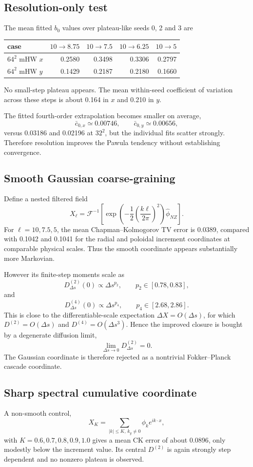 \documentclass[11pt,a4paper]{article}
\begin{document}
\subsection{Resolution-only test}
The mean fitted $b_0$ values over plateau-like seeds 0, 2 and 3 are
\begin{center}
\begin{tabular}{lrrrr}
\toprule
case & $10\to8.75$ & $10\to7.5$ & $10\to6.25$ & $10\to5$\\
\midrule
$64^2$ mHW $x$ & 0.2580 & 0.3498 & 0.3306 & 0.2797\\
$64^2$ mHW $y$ & 0.1429 & 0.2187 & 0.2180 & 0.1660\\
\bottomrule
\end{tabular}
\end{center}
No small-step plateau appears. The mean within-seed coefficient of variation across these steps is about 0.164 in $x$ and 0.210 in $y$.

The fitted fourth-order extrapolation becomes smaller on average,
\[
\bar c_{0,x}\simeq0.00746,
\qquad
\bar c_{0,y}\simeq0.00656,
\]
versus 0.03186 and 0.02196 at $32^2$, but the individual fits scatter strongly. Therefore resolution improves the Pawula tendency without establishing convergence.

\subsection{Smooth Gaussian coarse-graining}
Define a nested filtered field
\[
X_\ell=\mathcal F^{-1}\!\left[
\exp\!\left(-\frac12\left(\frac{k\ell}{2\pi}\right)^2\right)
\widehat\phi_{NZ}\right].
\]
For $\ell=10,7.5,5$, the mean Chapman--Kolmogorov TV error is 0.0389, compared with 0.1042 and 0.1041 for the radial and poloidal increment coordinates at comparable physical scales. Thus the smooth coordinate appears substantially more Markovian.

However its finite-step moments scale as
\[
D^{(2)}_{\Delta s}(0)\propto\Delta s^{p_2},
\qquad
p_2\in[0.78,0.83],
\]
and
\[
D^{(4)}_{\Delta s}(0)\propto\Delta s^{p_4},
\qquad
p_4\in[2.68,2.86].
\]
This is close to the differentiable-scale expectation $\Delta X=O(\Delta s)$, for which $D^{(2)}=O(\Delta s)$ and $D^{(4)}=O(\Delta s^3)$. Hence the improved closure is bought by a degenerate diffusion limit,
\[
\lim_{\Delta s\to0}D^{(2)}_{\Delta s}=0.
\]
The Gaussian coordinate is therefore rejected as a nontrivial Fokker--Planck cascade coordinate.

\subsection{Sharp spectral cumulative coordinate}
A non-smooth control,
\[
X_K=\sum_{|k|\le K,\,k_y\ne0}\phi_k e^{i k\cdot x},
\]
with $K=0.6,0.7,0.8,0.9,1.0$ gives a mean CK error of about 0.0896, only modestly below the increment value. Its central $D^{(2)}$ is again strongly step dependent and no nonzero plateau is observed.
\end{document}
